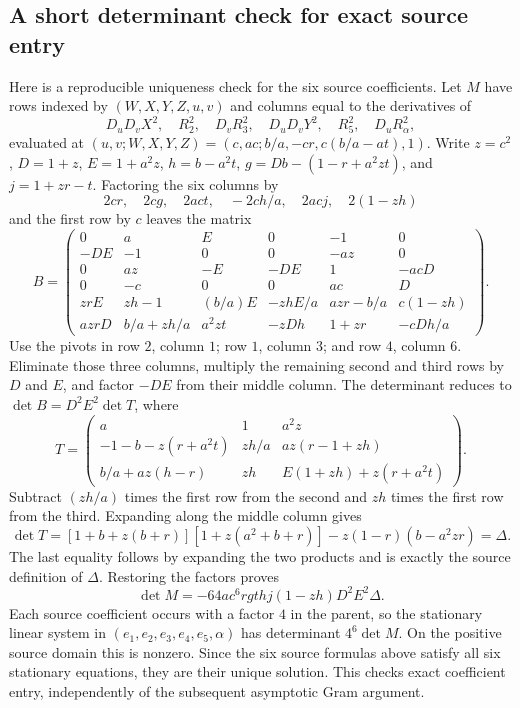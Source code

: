 \subsection{A short determinant check for exact source entry}
\label{sec:c2-contact-determinant}

Here is a reproducible uniqueness check for the six source coefficients.
Let $M$ have rows indexed by $(W,X,Y,Z,u,v)$ and columns equal to the
derivatives of
\[
D_uD_vX^2,\quad R_2^2,\quad D_vR_3^2,\quad
D_uD_vY^2,\quad R_5^2,\quad D_uR_\alpha^2,
\]
evaluated at $(u,v;W,X,Y,Z)=(c,ac;b/a,-cr,c(b/a-at),1)$.
Write $z=c^2$, $D=1+z$, $E=1+a^2z$, $h=b-a^2t$,
$g=Db-(1-r+a^2zt)$, and $j=1+zr-t$.
Factoring the six columns by
\[
2cr,\quad2cg,\quad2act,\quad-2ch/a,\quad2acj,
\quad2(1-zh)
\]
and the first row by $c$ leaves the matrix
\[
B=\begin{pmatrix}
0&a&E&0&-1&0\\
-DE&-1&0&0&-az&0\\
0&az&-E&-DE&1&-acD\\
0&-c&0&0&ac&D\\
zrE&zh-1&(b/a)E&-zhE/a&azr-b/a&c(1-zh)\\
azrD&b/a+zh/a&a^2zt&-zDh&1+zr&-cDh/a
\end{pmatrix}.
\]
Use the pivots in row $2$, column $1$; row $1$, column $3$; and
row $4$, column $6$.  Eliminate those three columns, multiply the
remaining second and third rows by $D$ and $E$, and factor $-DE$
from their middle column.  The determinant reduces to
$\det B=D^2E^2\det T$, where
\[
T=\begin{pmatrix}
a&1&a^2z\\
-1-b-z(r+a^2t)&zh/a&az(r-1+zh)\\
b/a+az(h-r)&zh&E(1+zh)+z(r+a^2t)
\end{pmatrix}.
\]
Subtract $(zh/a)$ times the first row from the second and $zh$ times
the first row from the third.  Expanding along the middle column gives
\[
\det T=[1+b+z(b+r)][1+z(a^2+b+r)]
-z(1-r)(b-a^2zr)=\Delta.
\]
The last equality follows by expanding the two products and is exactly
the source definition of $\Delta$.  Restoring the factors proves
\begin{equation}
\det M=-64a c^6rgt h j(1-zh)D^2E^2\Delta.
\label{eq:c2-entry-determinant}
\end{equation}
Each source coefficient occurs with a factor $4$ in the parent, so the
stationary linear system in $(e_1,e_2,e_3,e_4,e_5,\alpha)$ has determinant
$4^6\det M$.  On the positive source domain this is nonzero.  Since the
six source formulas above satisfy all six stationary equations,
they are their unique solution.  This checks exact coefficient entry,
independently of the subsequent asymptotic Gram argument.

